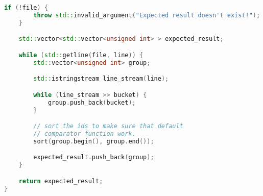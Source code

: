 \begin{lstlisting}[language=C++, caption=Implementasi 
modul \texttt{parser.cpp},label={lamp:module-parser}]
    if (!file) {
        throw std::invalid_argument("Expected result doesn't exist!");
    }

    std::vector<std::vector<unsigned int> > expected_result;

    while (std::getline(file, line)) {
        std::vector<unsigned int> group;

        std::istringstream line_stream(line);

        while (line_stream >> bucket) {
            group.push_back(bucket);
        }

        // sort the ids to make sure that default
        // comparator function work.
        sort(group.begin(), group.end());

        expected_result.push_back(group);
    }

    return expected_result;
}
\end{lstlisting}

